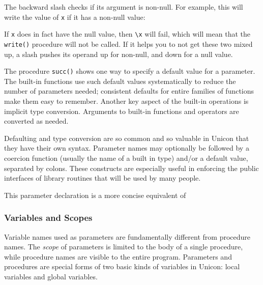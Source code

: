 The backward slash checks if its argument is non-null. For example, this
will write the value of \texttt{x} if it has a non-null value:


If \texttt{x} does in fact have the null value, then \texttt{{\textbackslash}x} will fail, which will mean
that the \texttt{write()} procedure will not be called. If it helps you
to not get these two mixed up, a slash pushes its operand
{\textquotedbl}up{\textquotedbl} for non-null, and
{\textquotedbl}down{\textquotedbl} for a null value.

The procedure \texttt{succ()} shows one way to
specify a default value for a parameter. The built-in functions use
such default values systematically to reduce the number of parameters
needed; consistent defaults for entire families of functions make them
easy to remember. Another key aspect of the built-in operations is
implicit type conversion. Arguments to built-in functions and operators
are converted as needed.

Defaulting and type
conversion are so common and so valuable in Unicon that they have their
own syntax. Parameter names may optionally be followed by a coercion
function (usually the name of a built in type) and/or a default value,
separated by colons. These constructs are especially useful in
enforcing the public interfaces of library routines that will be used
by many people.


\noindent
This parameter declaration is a more concise equivalent of


\subsubsection{Variables and Scopes}

Variable names used as parameters are fundamentally
different from procedure names. The
\textit{scope} of parameters is limited to the body of a single
procedure, while procedure names are visible to the entire program.
Parameters and procedures are special forms of two basic kinds
of variables in Unicon: local variables and global variables.

